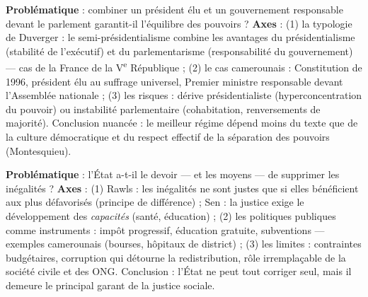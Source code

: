 \documentclass[11pt]{article}
\begin{document}
\begin{exemplebox}
\textbf{Problématique} : combiner un président élu et un gouvernement responsable devant le parlement garantit-il l'équilibre des pouvoirs ?
\textbf{Axes} : (1) la typologie de Duverger : le semi-présidentialisme combine les avantages du présidentialisme (stabilité de l'exécutif) et du parlementarisme (responsabilité du gouvernement) — cas de la France de la V\textsuperscript{e} République ; (2) le cas camerounais : Constitution de 1996, président élu au suffrage universel, Premier ministre responsable devant l'Assemblée nationale ; (3) les risques : dérive présidentialiste (hyperconcentration du pouvoir) ou instabilité parlementaire (cohabitation, renversements de majorité). Conclusion nuancée : le meilleur régime dépend moins du texte que de la culture démocratique et du respect effectif de la séparation des pouvoirs (Montesquieu).
\end{exemplebox}

\begin{exemplebox}
\textbf{Problématique} : l'État a-t-il le devoir — et les moyens — de supprimer les inégalités ?
\textbf{Axes} : (1) Rawls : les inégalités ne sont justes que si elles bénéficient aux plus défavorisés (principe de différence) ; Sen : la justice exige le développement des \emph{capacités} (santé, éducation) ; (2) les politiques publiques comme instruments : impôt progressif, éducation gratuite, subventions — exemples camerounais (bourses, hôpitaux de district) ; (3) les limites : contraintes budgétaires, corruption qui détourne la redistribution, rôle irremplaçable de la société civile et des ONG. Conclusion : l'État ne peut tout corriger seul, mais il demeure le principal garant de la justice sociale.
\end{exemplebox}
\end{document}
